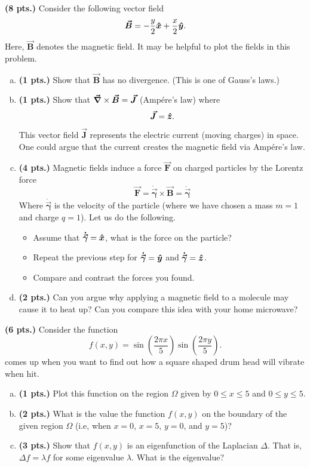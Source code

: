 \documentclass[12pt]{article} %
\newcommand{\tangentgamma}{\boldsymbol{\dot{\vec{\gamma}}}}
\newcommand{\normalgamma}{\boldsymbol{\ddot{\vec{\gamma}}}}
\newcommand{\vecfieldB}{\boldsymbol{\vec{B}}}
\newcommand{\vecfieldJ}{\boldsymbol{\vec{J}}}
\newcommand{\vecfieldF}{\boldsymbol{\vec{F}}}
\begin{document}
\vspace*{0.5cm}

\begin{problem}
\textbf{(8 pts.)} Consider the following vector field
\[
\vecfieldB = -\frac{y}{2}\xhat + \frac{x}{2}\yhat.
\]
Here, $\vecfieldB$ denotes the magnetic field. It may be helpful to plot the fields in this problem.
\begin{enumerate}[(a)]
    \item \textbf{(1 pts.)} Show that $\vecfieldB$ has no divergence. (This is one of Gauss's laws.)
    \item \textbf{(1 pts.)} Show that $\grad \times \vecfieldB = \vecfieldJ$ (Amp\'ere's law) where
    \[
    \vecfieldJ = \zhat.
    \]
    This vector field $\vecfieldJ$ represents the electric current (moving charges) in space. One could argue that the current creates the magnetic field via Amp\'ere's law.
    \item \textbf{(4 pts.)} Magnetic fields induce a force $\vecfieldF$ on charged particles by the Lorentz force
    \[
    \vecfieldF = \tangentgamma \times \vecfieldB = \normalgamma
    \]
    Where $\tangentgamma$ is the velocity of the particle (where we have chosen a mass $m=1$ and charge $q=1$).  Let us do the following.
    \begin{itemize}
        \item Assume that $\tangentgamma = \xhat$, what is the force on the particle?
        \item Repeat the previous step for $\tangentgamma=\yhat$ and $\tangentgamma=\zhat$.
        \item Compare and contrast the forces you found.
    \end{itemize}
    \item \textbf{(2 pts.)} Can you argue why applying a magnetic field to a molecule may cause it to heat up? Can you compare this idea with your home microwave?
\end{enumerate}
\end{problem}

\vspace*{0.5cm}

\begin{problem}
\textbf{(6 pts.)} Consider the function
\[
f(x,y)=\sin\left(\frac{2\pi x}{5}\right)\sin\left(\frac{2\pi y}{5}\right).
\]
comes up when you want to find out how a square shaped drum head will vibrate when hit.
\begin{enumerate}[(a)]
    \item \textbf{(1 pts.)} Plot this function on the region $\Omega$ given by $0\leq x \leq 5$ and $0\leq y \leq 5$.
    \item \textbf{(2 pts.)} What is the value the function $f(x,y)$ on the boundary of the given region $\Omega$ (i.e, when $x=0$, $x=5$, $y=0$, and $y=5$)?
    \item \textbf{(3 pts.)} Show that $f(x,y)$ is an eigenfunction of the Laplacian $\Delta$. That is, $\Delta f = \lambda f$ for some eigenvalue $\lambda$. What is the eigenvalue?
\end{enumerate}
\end{problem}
\end{document}
